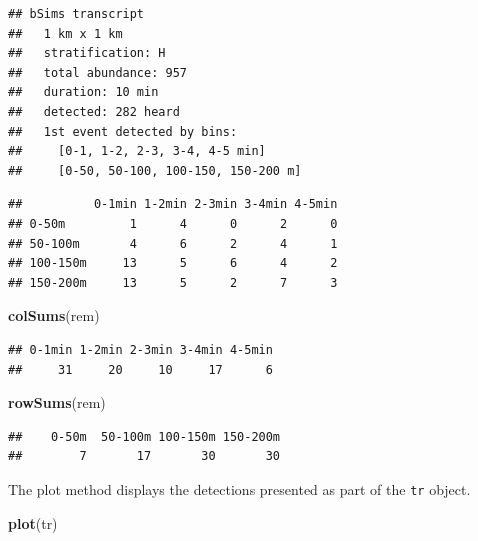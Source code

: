 \documentclass[12pt,]{book}
\newenvironment{Shaded}{\begin{snugshade}}{\end{snugshade}}
\newcommand{\CommentTok}[1]{\textcolor[rgb]{0.56,0.35,0.01}{\textit{#1}}}
\newcommand{\KeywordTok}[1]{\textcolor[rgb]{0.13,0.29,0.53}{\textbf{#1}}}
\newcommand{\NormalTok}[1]{#1}
\newcommand{\OperatorTok}[1]{\textcolor[rgb]{0.81,0.36,0.00}{\textbf{#1}}}
\newcommand{\StringTok}[1]{\textcolor[rgb]{0.31,0.60,0.02}{#1}}
\begin{document}
\begin{verbatim}
## bSims transcript
##   1 km x 1 km
##   stratification: H
##   total abundance: 957
##   duration: 10 min
##   detected: 282 heard
##   1st event detected by bins:
##     [0-1, 1-2, 2-3, 3-4, 4-5 min]
##     [0-50, 50-100, 100-150, 150-200 m]
\end{verbatim}

\begin{Shaded}
\end{Shaded}

\begin{verbatim}
##          0-1min 1-2min 2-3min 3-4min 4-5min
## 0-50m         1      4      0      2      0
## 50-100m       4      6      2      4      1
## 100-150m     13      5      6      4      2
## 150-200m     13      5      2      7      3
\end{verbatim}

\begin{Shaded}
\begin{Highlighting}[]
\KeywordTok{colSums}\NormalTok{(rem)}
\end{Highlighting}
\end{Shaded}

\begin{verbatim}
## 0-1min 1-2min 2-3min 3-4min 4-5min 
##     31     20     10     17      6
\end{verbatim}

\begin{Shaded}
\begin{Highlighting}[]
\KeywordTok{rowSums}\NormalTok{(rem)}
\end{Highlighting}
\end{Shaded}

\begin{verbatim}
##    0-50m  50-100m 100-150m 150-200m 
##        7       17       30       30
\end{verbatim}

The plot method displays the detections presented as part of the \texttt{tr} object.

\begin{Shaded}
\begin{Highlighting}[]
\KeywordTok{plot}\NormalTok{(tr)}
\end{Highlighting}
\end{Shaded}
\end{document}
